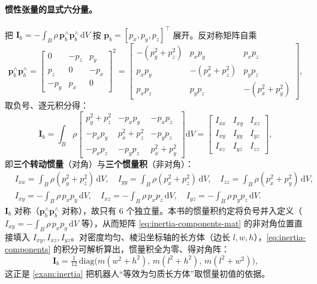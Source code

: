 \paragraph{惯性张量的显式六分量。}
把 $\mathbf{I}_b=-\int_B\rho\,\boldsymbol{p}_b^\wedge\boldsymbol{p}_b^\wedge\,\mathrm{d}V$ 按 $\boldsymbol{p}_b=[p_x,p_y,p_z]^\top$ 展开。反对称矩阵自乘
\begin{equation}
  \boldsymbol{p}_b^\wedge\boldsymbol{p}_b^\wedge
  =\begin{bmatrix}0&-p_z&p_y\\p_z&0&-p_x\\-p_y&p_x&0\end{bmatrix}^2
  =\begin{bmatrix}-(p_y^2+p_z^2)&p_xp_y&p_xp_z\\ p_xp_y&-(p_x^2+p_z^2)&p_yp_z\\ p_xp_z&p_yp_z&-(p_x^2+p_y^2)\end{bmatrix},
  \label{eq:pwedge-sq}
\end{equation}
取负号、逐元积分得\cite{unitree2023quadruped}：
\begin{equation}
  \mathbf{I}_b=\int_B\rho\begin{bmatrix}p_y^2+p_z^2&-p_xp_y&-p_xp_z\\-p_xp_y&p_x^2+p_z^2&-p_yp_z\\-p_xp_z&-p_yp_z&p_x^2+p_y^2\end{bmatrix}\mathrm{d}V
  =\begin{bmatrix}I_{xx}&I_{xy}&I_{xz}\\I_{xy}&I_{yy}&I_{yz}\\I_{xz}&I_{yz}&I_{zz}\end{bmatrix},
  \label{eq:inertia-components-mat}
\end{equation}
即\textbf{三个转动惯量}（对角）与\textbf{三个惯量积}（非对角）\cite{unitree2023quadruped}：
\begin{equation}
\begin{aligned}
  &I_{xx}=\int_B\rho(p_y^2+p_z^2)\,\mathrm{d}V,\quad
  I_{yy}=\int_B\rho(p_x^2+p_z^2)\,\mathrm{d}V,\quad
  I_{zz}=\int_B\rho(p_x^2+p_y^2)\,\mathrm{d}V,\\
  &I_{xy}=-\int_B\rho\,p_xp_y\,\mathrm{d}V,\quad
  I_{xz}=-\int_B\rho\,p_xp_z\,\mathrm{d}V,\quad
  I_{yz}=-\int_B\rho\,p_yp_z\,\mathrm{d}V.
\end{aligned}
\label{eq:inertia-components}
\end{equation}
$\mathbf{I}_b$ 对称（$\boldsymbol{p}_b^\wedge\boldsymbol{p}_b^\wedge$ 对称），故只有 $6$ 个独立量。本书的惯量积约定将负号并入定义（$I_{xy}=-\int_B\rho\,p_xp_y\,\mathrm{d}V$ 等），从而矩阵 \cref{eq:inertia-components-mat} 的非对角位置直接填入 $I_{xy},I_{xz},I_{yz}$。对密度均匀、棱沿坐标轴的长方体（边长 $l,w,h$），\cref{eq:inertia-components} 的积分可解析算出，惯量积全为零、得对角阵\cite{unitree2023quadruped}：
\begin{equation}
  \mathbf{I}_b=\tfrac{1}{12}\,\mathrm{diag}\!\big(m(w^2+h^2),\,m(l^2+h^2),\,m(l^2+w^2)\big),
  \label{eq:inertia-box}
\end{equation}
这正是 \cref{exam:inertia} 把机器人“等效为匀质长方体”取惯量初值的依据。


